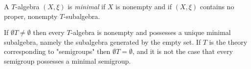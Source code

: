 A $T$-algebra $(X, \xi)$ is \textit{minimal} if $X$ is nonempty and if $(X, \xi)$ contains no proper, nonempty $T$-subalgebra.

If $\emptyset T \neq \emptyset$ then every $T$-algebra is nonempty and possesses a unique minimal subalgebra, namely the subalgebra generated by the empty set. If $T$ is the theory corresponding to "semigroups" then $\emptyset T = \emptyset$, and it is not the case that every semigroup possesses a minimal semigroup.
